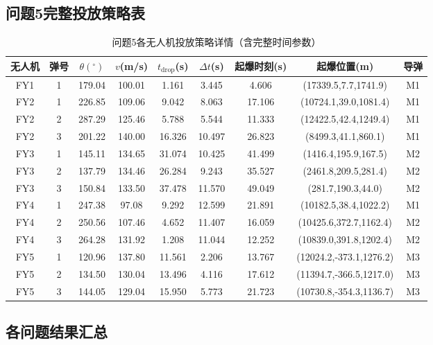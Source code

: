 \documentclass[12pt,a4paper]{ctexart}
\begin{document}
\subsection{问题5完整投放策略表}

\begin{table}[H]
\centering
\caption{问题5各无人机投放策略详情（含完整时间参数）}
\small
\begin{tabular}{c|c|c|c|c|c|c|c|c}
\toprule
\textbf{无人机} & \textbf{弹号} & $\theta(^\circ)$ & $v$(m/s) & $t_{\text{drop}}$(s) & $\Delta t$(s) & 起爆时刻(s) & 起爆位置(m) & 导弹 \\
\midrule
FY1 & 1 & 179.04 & 100.01 & 1.161 & 3.445 & 4.606 & (17339.5,7.7,1741.9) & M1 \\
FY2 & 1 & 226.85 & 109.06 & 9.042 & 8.063 & 17.106 & (10724.1,39.0,1081.4) & M1 \\
FY2 & 2 & 287.29 & 125.46 & 5.788 & 5.544 & 11.333 & (12422.5,42.4,1249.4) & M1 \\
FY2 & 3 & 201.22 & 140.00 & 16.326 & 10.497 & 26.823 & (8499.3,41.1,860.1) & M1 \\
FY3 & 1 & 145.11 & 134.65 & 31.074 & 10.425 & 41.499 & (1416.4,195.9,167.5) & M2 \\
FY3 & 2 & 137.79 & 134.46 & 26.284 & 9.243 & 35.527 & (2461.8,209.5,281.4) & M2 \\
FY3 & 3 & 150.84 & 133.50 & 37.478 & 11.570 & 49.049 & (281.7,190.3,44.0) & M2 \\
FY4 & 1 & 247.38 & 97.08 & 9.292 & 12.599 & 21.891 & (10182.5,38.4,1022.2) & M1 \\
FY4 & 2 & 250.56 & 107.46 & 4.652 & 11.407 & 16.059 & (10425.6,372.7,1162.4) & M2 \\
FY4 & 3 & 264.28 & 131.92 & 1.208 & 11.044 & 12.252 & (10839.0,391.8,1202.4) & M2 \\
FY5 & 1 & 120.96 & 137.80 & 11.561 & 2.206 & 13.767 & (12024.2,-373.1,1276.2) & M3 \\
FY5 & 2 & 134.50 & 130.04 & 13.496 & 4.116 & 17.612 & (11394.7,-366.5,1217.0) & M3 \\
FY5 & 3 & 144.05 & 129.04 & 15.950 & 5.773 & 21.723 & (10730.8,-354.3,1136.7) & M3 \\
\bottomrule
\end{tabular}
\end{table}

\subsection{各问题结果汇总}
\end{document}

